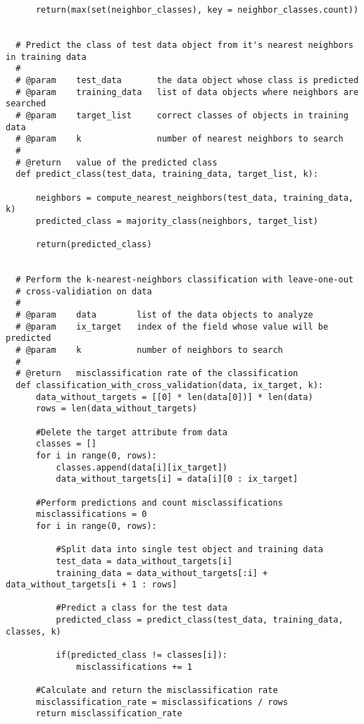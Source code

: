 \documentclass[a4paper]{article}
\begin{document}
\begin{lstlisting}
      return(max(set(neighbor_classes), key = neighbor_classes.count))


  # Predict the class of test data object from it's nearest neighbors in training data
  #
  # @param    test_data       the data object whose class is predicted
  # @param    training_data   list of data objects where neighbors are searched
  # @param    target_list     correct classes of objects in training data
  # @param    k               number of nearest neighbors to search
  #  
  # @return   value of the predicted class
  def predict_class(test_data, training_data, target_list, k):

      neighbors = compute_nearest_neighbors(test_data, training_data, k)
      predicted_class = majority_class(neighbors, target_list)

      return(predicted_class)


  # Perform the k-nearest-neighbors classification with leave-one-out
  # cross-validiation on data
  #
  # @param    data        list of the data objects to analyze
  # @param    ix_target   index of the field whose value will be predicted
  # @param    k           number of neighbors to search
  #
  # @return   misclassification rate of the classification
  def classification_with_cross_validation(data, ix_target, k):
      data_without_targets = [[0] * len(data[0])] * len(data)
      rows = len(data_without_targets)

      #Delete the target attribute from data
      classes = []
      for i in range(0, rows):
          classes.append(data[i][ix_target])
          data_without_targets[i] = data[i][0 : ix_target]

      #Perform predictions and count misclassifications
      misclassifications = 0
      for i in range(0, rows):

          #Split data into single test object and training data
          test_data = data_without_targets[i]
          training_data = data_without_targets[:i] + data_without_targets[i + 1 : rows]

          #Predict a class for the test data
          predicted_class = predict_class(test_data, training_data, classes, k)

          if(predicted_class != classes[i]):
              misclassifications += 1

      #Calculate and return the misclassification rate 
      misclassification_rate = misclassifications / rows
      return misclassification_rate
  \end{lstlisting}



  
\end{document}
